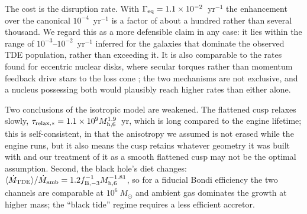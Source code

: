 \documentclass[preprint2]{aastex}
\newcommand{\msun}{M_{\odot}\xspace}
\newcommand{\mhsix}{M_{\rm h,6}\xspace}
\begin{document}
The cost is the disruption rate. With $\Gamma_{\rm eq} = 1.1 \times 10^{-2}$~yr$^{-1}$ the enhancement over the canonical $10^{-4}$~yr$^{-1}$ is a factor of about a hundred rather than several thousand. We regard this as a more defensible claim in any case: it lies within the range of $10^{-3}$--$10^{-2}$~yr$^{-1}$ inferred for the galaxies that dominate the observed TDE population, rather than exceeding it. It is also comparable to the rates found for eccentric nuclear disks, where secular torques rather than momentum feedback drive stars to the loss cone \citep{Madigan:2018a,Wernke:2019a}; the two mechanisms are not exclusive, and a nucleus possessing both would plausibly reach higher rates than either alone.

Two conclusions of the isotropic model are weakened. The flattened cusp relaxes slowly, $\tau_{\rm relax,\ast} = 1.1 \times 10^{9} \mhsix^{1.9}$~yr, which is long compared to the engine lifetime; this is self-consistent, in that the anisotropy we assumed is not erased while the engine runs, but it also means the cusp retains whatever geometry it was built with and our treatment of it as a smooth flattened cusp may not be the optimal assumption. Second, the black hole's diet changes: $\langle \dot{M}_{\rm TDE}\rangle/\dot{M}_{\rm amb} = 1.2 f_{\rm B,-3}^{-1} \mhsix^{-1.81}$, so for a fiducial Bondi efficiency the two channels are comparable at $10^{6}~\msun$ and ambient gas dominates the growth at higher mass; the ``black tide'' regime requires a less efficient accretor.
\end{document}
